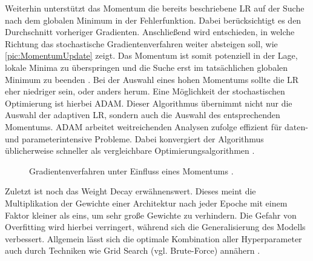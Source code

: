 \noindent
Weiterhin unterstützt das Momentum die bereits beschriebene \ac{LR} auf der Suche nach dem globalen Minimum in der Fehlerfunktion. Dabei berücksichtigt es den Durchschnitt vorheriger Gradienten. Anschließend wird entschieden, in welche Richtung das stochastische Gradientenverfahren weiter absteigen soll, wie \autoref{pic:MomentumUpdate} zeigt. Das Momentum ist somit potenziell in der Lage, lokale Minima zu überspringen und die Suche erst im tatsächlichen globalen Minimum zu beenden \cite[S.~292-295]{GOO16}. Bei der Auswahl eines hohen Momentums sollte die \ac{LR} eher niedriger sein, oder anders herum. Eine Möglichkeit der stochastischen Optimierung ist hierbei \ac{ADAM}. Dieser Algorithmus übernimmt nicht nur die Auswahl der adaptiven \ac{LR}, sondern auch die Auswahl des entsprechenden Momentums. \ac{ADAM} arbeitet weitreichenden Analysen zufolge effizient für daten- und parameterintensive Probleme. Dabei konvergiert der Algorithmus üblicherweise schneller als vergleichbare Optimierungsalgorithmen \cite[S.~1-2]{KIN17}.

\begin{figure}[h!]
  \centering
  \caption{Gradientenverfahren unter Einfluss eines Momentums \cite{CSNOJ}.}
  \label{pic:MomentumUpdate}
\end{figure}
\newpage

\noindent
Zuletzt ist noch das Weight Decay erwähnenswert. Dieses meint die Multiplikation der Gewichte einer Architektur nach jeder Epoche mit einem Faktor kleiner als eins, um sehr große Gewichte zu verhindern. Die Gefahr von Overfitting wird hierbei verringert, während sich die Generalisierung des Modells verbessert. Allgemein lässt sich die optimale Kombination aller Hyperparameter auch durch Techniken wie Grid Search (vgl. Brute-Force) annähern \cite[S.~24]{YAN20}.


